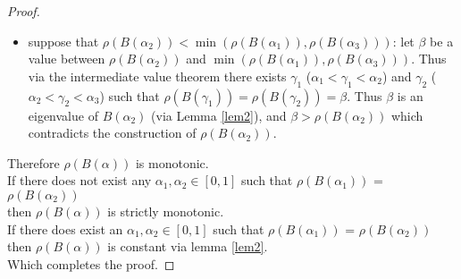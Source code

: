 \begin{proof}
\begin{itemize}[leftmargin=*,labelsep=4mm]
\item   suppose that $\rho(B(\alpha_2))<\min(\rho(B(\alpha_1)),\rho(B(\alpha_3)))$: let $\beta$ be a value between $\rho(B(\alpha_2))$ and $\min(\rho(B(\alpha_1)),\rho(B(\alpha_3)))$. Thus via the intermediate value theorem there exists $\gamma_1$ ($\alpha_1<\gamma_1<\alpha_2$) and $\gamma_2$ ($\alpha_2<\gamma_2<\alpha_3$) such that $\rho(B(\gamma_1))=\rho(B(\gamma_2))=\beta$. Thus $\beta$ is an eigenvalue of $B(\alpha_2)$ (via Lemma \ref{lem2}), and $\beta > \rho(B(\alpha_2))$ which contradicts the construction of $\rho(B(\alpha_2))$.
\end{itemize}
Therefore $\rho(B(\alpha))$ is monotonic.\\
If there does not exist any $\alpha_1,\alpha_2\in[0,1]$ such that $\rho(B(\alpha_1))$ = $\rho(B(\alpha_2))$\\
\-\hspace{8mm}then $\rho(B(\alpha))$ is strictly monotonic.\\
If there does exist an $\alpha_1,\alpha_2\in[0,1]$ such that $\rho(B(\alpha_1))$ = $\rho(B(\alpha_2))$\\
\-\hspace{8mm}then $\rho(B(\alpha))$ is constant via lemma \ref{lem2}.\\
Which completes the proof.
\end{proof}


